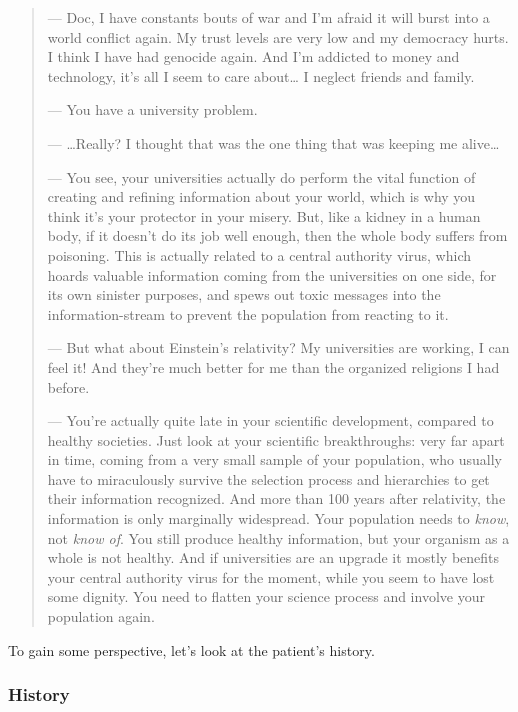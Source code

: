 \documentclass[11pt]{article}
\begin{document}
\begin{quote}
\small
\noindent --- Doc, I have constants bouts of war and I'm afraid it will burst into a world
conflict again. My trust levels are very low and my democracy hurts. I think I have had
genocide again. And I'm addicted to money and technology, it's all I seem to care
about\ldots{} I neglect friends and family.\par
\noindent --- You have a university problem.\par
\noindent --- \ldots{}Really? I thought that was the one thing that was keeping me alive\ldots{}\par
\noindent --- You see, your universities actually do perform the vital function of creating and
refining information about your world, which is why you think it's your protector in
your misery. But, like a kidney in a human body, if it doesn't do its job well enough,
then the whole body suffers from poisoning. This is actually related to a central
authority virus, which hoards valuable information coming from the universities on one
side, for its own sinister purposes, and spews out toxic messages into the
information-stream to prevent the population from reacting to it.\par
\noindent --- But what about Einstein's relativity? My universities are working, I can feel it!
And they're much better for me than the organized religions I had before.\par
\noindent --- You're actually quite late in your scientific development, compared to healthy
societies. Just look at your scientific breakthroughs: very far apart in time, coming
from a very small sample of your population, who usually have to miraculously survive
the selection process and hierarchies to get their information recognized. And more than
100 years after relativity, the information is only marginally widespread. Your
population needs to \emph{know}, not \emph{know of}. You still produce healthy
information, but your organism as a whole is not healthy. And if universities are an
upgrade it mostly benefits your central authority virus for the moment, while you seem
to have lost some dignity. You need to flatten your science process and involve your
population again.\par
\end{quote}

To gain some perspective, let's look at the patient's history.

\subsubsection*{History}
\end{document}

